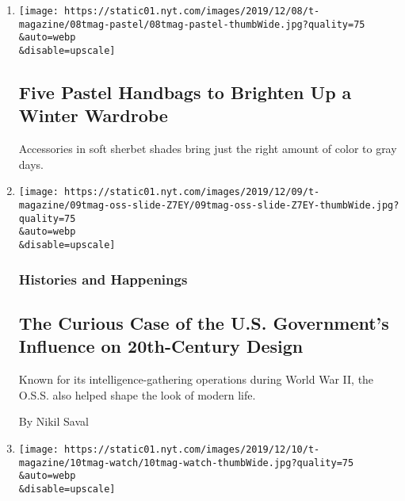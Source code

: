 \begin{enumerate}
\def\labelenumi{\arabic{enumi}.}
\item
  \href{/2019/12/11/t-magazine/pastel-handbags.html}{}

  \texttt{[image: https://static01.nyt.com/images/2019/12/08/t-magazine/08tmag-pastel/08tmag-pastel-thumbWide.jpg?quality=75\\\&auto=webp\\\&disable=upscale]}

  \hypertarget{five-pastel-handbags-to-brighten-up-a-winter-wardrobe}{%
  \subsection{Five Pastel Handbags to Brighten Up a Winter
  Wardrobe}\label{five-pastel-handbags-to-brighten-up-a-winter-wardrobe}}

  Accessories in soft sherbet shades bring just the right amount of
  color to gray days.
\item
  \href{/2019/12/11/t-magazine/us-government-20th-century-design.html}{}

  \texttt{[image: https://static01.nyt.com/images/2019/12/09/t-magazine/09tmag-oss-slide-Z7EY/09tmag-oss-slide-Z7EY-thumbWide.jpg?quality=75\\\&auto=webp\\\&disable=upscale]}

  \hypertarget{histories-and-happenings}{%
  \subsubsection{Histories and
  Happenings}\label{histories-and-happenings}}

  \hypertarget{the-curious-case-of-the-us-governments-influence-on-20th-century-design}{%
  \subsection{The Curious Case of the U.S. Government's Influence on
  20th-Century
  Design}\label{the-curious-case-of-the-us-governments-influence-on-20th-century-design}}

  Known for its intelligence-gathering operations during World War II,
  the O.S.S. also helped shape the look of modern life.

  By Nikil Saval
\item
  \href{/2019/12/10/t-magazine/vacheron-constantin-watch.html}{}

  \texttt{[image: https://static01.nyt.com/images/2019/12/10/t-magazine/10tmag-watch/10tmag-watch-thumbWide.jpg?quality=75\\\&auto=webp\\\&disable=upscale]}


\end{enumerate}
